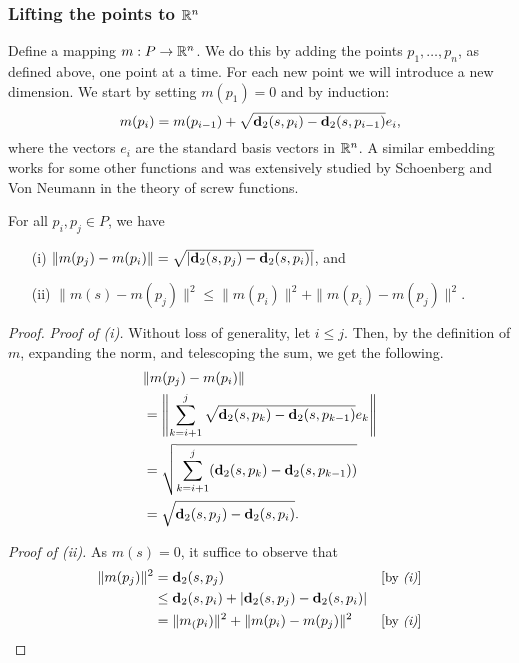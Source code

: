 \subsubsection{Lifting the points to ${\mathbb R}^n$} %
\label{sec:lifting}

  Define a mapping $m: P \to {\mathbb R}^n$.  We do this by adding the points $p_1, \ldots, p_n$, as defined above, one point at a time.
  For each new point we will introduce a new dimension. We start by setting $m(p_1) = 0$ and by induction:
  \begin{equation}\label{eq:defn_of_m}
    m(p_i) = m(p_{i-1}) + \sqrt{\mathbf{d}_2(s, p_i) - \mathbf{d}_2(s, p_{i-1})} e_i,
  \end{equation}
  where the vectors $e_i$ are the standard basis vectors in ${\mathbb R}^n$.
  A similar embedding works for some other functions and was extensively studied by Schoenberg and Von Neumann in the theory of screw functions.

  \begin{lemma}\label{lem:m_and_dist}
    For all $p_i, p_j\in P$, we have
    \begin{enumerate}
      \item[(i)] $\|m(p_j) - m(p_i)\| = \sqrt{|\mathbf{d}_2(s,p_j) - \mathbf{d}_2(s,p_i)|}$, and
      \item[(ii)]$\|m(s) - m(p_j)\|^2 \le \|m(p_i)\|^2 + \|m(p_i) - m(p_j)\|^2$.
    \end{enumerate}
  \end{lemma}
  \begin{proof}
    \emph{Proof of (i).}
    Without loss of generality, let $i \le j$.
    Then, by the definition of $m$, expanding the norm, and telescoping the sum, we get the following.
    \begin{align*}
      & \|m(p_j) - m(p_i)\| \\
      &= \left\|\sum_{k=i+1}^j \sqrt{\mathbf{d}_2(s, p_k) - \mathbf{d}_2(s, p_{k-1})} e_k \right\| \\
      &= \sqrt{\sum_{k=i+1}^j (\mathbf{d}_2(s, p_k) - \mathbf{d}_2(s, p_{k-1}))}\\
      &= \sqrt{\mathbf{d}_2(s, p_j) - \mathbf{d}_2(s, p_i)}.
    \end{align*}

    \noindent\emph{Proof of (ii).}
    As $m(s) = 0$, it suffice to observe that
    \begin{align*}
      \|m(p_j)\|^2
        &= \mathbf{d}_2(s, p_j) &\left[\text{\small{by \emph{(i)}}}\right]\\
        &\le \mathbf{d}_2(s, p_i) + |\mathbf{d}_2(s,p_j) - \mathbf{d}_2(s,p_i)| \\
        &= \|m_(p_i)\|^2 + \|m(p_i) - m(p_j)\|^2  &\left[\text{\small{by \emph{(i)}}}\right]
    \end{align*}
  \end{proof}

